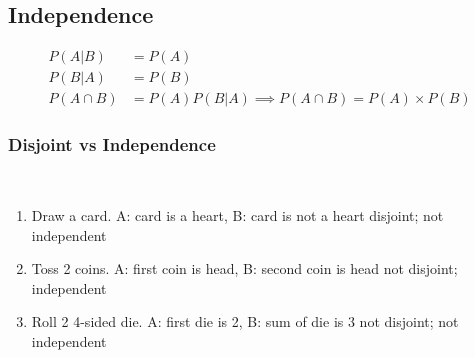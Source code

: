 \subsection{Independence}  %
\begin{align}
    P(A\vert B)&=P(A) \\
    P(B\vert A)&=P(B) \\
    P(A\cap B)&=P(A)P(B\vert A)\implies P(A\cap B)=P(A)\times P(B)
\end{align}
\subsubsection{Disjoint vs Independence}  %
 \\
\begin{enumerate}
    \item Draw a card. A: card is a heart, B: card is not a heart
          \subitem disjoint; not independent
    \item Toss 2 coins. A: first coin is head, B: second coin is head
          \subitem not disjoint; independent
    \item Roll 2 4-sided die. A: first die is 2, B: sum of die is 3
          \subitem not disjoint; not independent
\end{enumerate}
